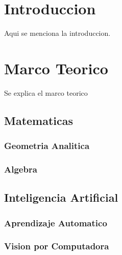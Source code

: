 \documentclass[12pt]{article}
\begin{document}
	\section{Introduccion}
	Aqui se menciona la introduccion.
	\section{Marco Teorico}
	Se explica el marco teorico
	\subsection{Matematicas}
	\subsubsection{Geometria Analitica}
	\subsubsection{Algebra}
	\subsection{Inteligencia Artificial}
	\subsubsection{Aprendizaje Automatico}
	\subsubsection{Vision por Computadora}
\end{document}
